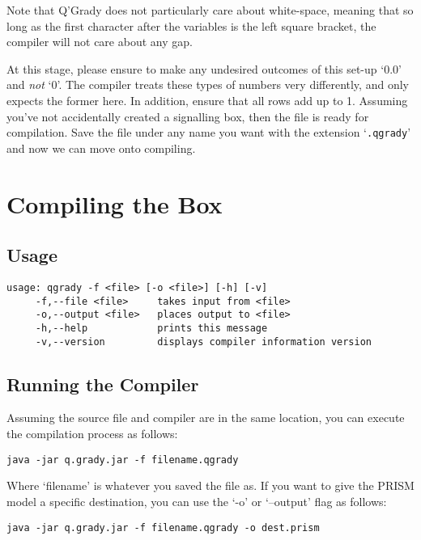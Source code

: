 \documentclass[report.tex]{subfiles}
\begin{document}
Note that Q'Grady does not particularly care about white-space, meaning that so
long as the first character after the variables is the left square bracket, the
compiler will not care about any gap.

At this stage, please ensure to make any undesired outcomes of this set-up `0.0'
and \emph{not} `0'. The compiler treats these types of numbers very differently,
and only expects the former here. In addition, ensure that all rows add up to 1.
Assuming you've not accidentally created a signalling box, then the file is
ready for compilation. Save the file under any name you want with the extension
`\texttt{.qgrady}' and now we can move onto compiling.

\section{Compiling the Box} %
\label{sec:compiling_the_box}
\subsection{Usage} %
\label{sub:usage}
\begin{lstlisting}[frame = single]
    usage: qgrady -f <file> [-o <file>] [-h] [-v]
     -f,--file <file>     takes input from <file>
     -o,--output <file>   places output to <file>
     -h,--help            prints this message
     -v,--version         displays compiler information version    
\end{lstlisting}

\subsection{Running the Compiler} %
\label{sub:running_the_compiler}
Assuming the source file and compiler are in the same location, you can execute
the compilation process as follows:
\begin{lstlisting}[frame = single]
    java -jar q.grady.jar -f filename.qgrady
\end{lstlisting}

Where `filename' is whatever you saved the file as. If you want to give the
PRISM model a specific destination, you can use the `-o' or `--output' flag as
follows:

\begin{lstlisting}[frame = single]
    java -jar q.grady.jar -f filename.qgrady -o dest.prism
\end{lstlisting}
\end{document}

